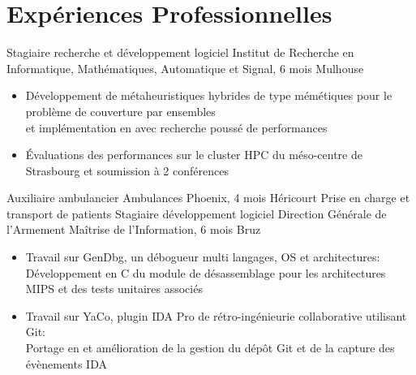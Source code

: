 \documentclass[a4paper,10pt,sans]{moderncv}
\begin{document}

	\vspace*{\deletedSpace}
	\section{Expériences Professionnelles}
			{Stagiaire recherche et développement logiciel}
			{Institut de Recherche en Informatique, Mathématiques, Automatique et Signal, 6 mois\hspace{-25pt}}
			{Mulhouse}
			{}
			{}
			\vspace{-5pt}
			\begin{itemize}
				\item Développement de métaheuristiques hybrides de type mémétiques pour le problème de couverture par ensembles\\
				et implémentation en \Cpp{} avec recherche poussé de performances
				\item Évaluations des performances sur le cluster HPC du méso-centre de Strasbourg et soumission à 2 conférences
			\end{itemize}
			\vspace{5pt}
			{Auxiliaire ambulancier}
			{Ambulances Phoenix, 4 mois}
			{Héricourt}
			{Prise en charge et transport de patients}
			{}
			{Stagiaire développement logiciel}
			{Direction Générale de l'Armement Maîtrise de l'Information, 6 mois}
			{Bruz}
			{}
			{}
			\vspace{-5pt}
			\begin{itemize}
				\item Travail sur GenDbg, un débogueur multi langages, OS et architectures:\\
					\phantom{=}Développement en C du module de désassemblage pour les architectures MIPS et des tests unitaires associés
				\item Travail sur YaCo, plugin IDA Pro de rétro-ingénieurie collaborative utilisant Git:\\
					\phantom{=}Portage en \Cpp{} et amélioration de la gestion du dépôt Git et de la capture des évènements IDA
			\end{itemize}
\end{document}
